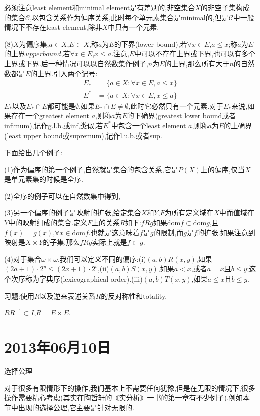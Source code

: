 \documentclass[12pt,a4paper,openany]{book}
\begin{document}
必须注意least element和minimal element是有差别的,非空集合$X$的非空子集构成的集合$\mathscr{C}$,以包含关系作为偏序关系,此时每个单元素集合是minimal的,但是$\mathscr{C}$中一般情况下不存在least element,除非$X$中只有一个元素.

(8)$X$为偏序集,$a \in X$,$E \subset X$,称$a$为$E$的下界(lower bound),若$\forall x \in E$,$a \le x$;称$a$为$E$的上界$upper bound$,若$\forall x \in E$,$x \le a$.注意,$E$中可以不存在上界或下界,也可以有多个上界或下界.后一种情况可以以自然数集作例子,$n$为$E$的上界,那么所有大于$n$的自然数都是$E$的上界.引入两个记号:
\[
\begin{aligned}
E_*&=\{a \in X:\forall x \in E, a \le x\} \\
E^*&=\{a \in X:\forall x \in E, x \le a\}
\end{aligned}
\]
$E_*$以及$E_* \cap E$都可能是$\emptyset$,如果$E_* \cap E \neq \emptyset$,此时它必然只有一个元素.对于$E_*$来说,如果存在一个greatest element $a$,则称$a$为$E$的下确界(greatest lower bound或者infimum),记作g.l.b.或inf,类似,若$E^*$中包含一个least element $a$,则称$a$为$E$的上确界(least upper bound或supremum),记作l.u.b.或者sup.

下面给出几个例子:

(1)作为偏序的第一个例子,自然就是集合的包含关系,它是$P(X)$上的偏序,仅当$X$是单元素集的时候是全序.

(2)全序的例子可以在自然数集中得到,

(3)另一个偏序的例子是映射的扩张,给定集合$X$和$Y$,$F$为所有定义域在$X$中而值域在$Y$中的映射组成的集合.定义$F$上的关系$R$如下:$fRg$如果$\text{dom}{f} \subset \text{dom}{g}$,且$f(x)=g(x)$,$\forall x \in \text{dom}{f}$.也就是这意味着$f$是$g$的限制,而$g$是$f$的扩张.如果注意到映射是$X \times Y$的子集,那么$fRg$实际上就是$f \subset g$.

(4)对于集合$\omega \times \omega$,我们可以定义不同的偏序:(i)$(a,b)R(x,y)$,如果$(2a+1)\cdot 2^y \le (2x+1) \cdot 2^b$,(ii)$(a,b)S(x,y)$,如果$a<x$,或者$a=x$且$b \le y$;这个次序称为字典序(lexicographical order).(iii)$(a,b)T(x,y)$,如果$a \le x$且$b \le y$.

习题:使用$R$以及逆来表述关系$R$的反对称性和totality.

$RR^{-1} \subset I$,$R = E \times E$.

\section{2013年06月10日}
选择公理

对于很多有限情形下的操作,我们基本上不需要任何犹豫,但是在无限的情况下,很多操作需要精心考虑(其实在陶哲轩的《实分析》一书的第一章有不少例子).例如本节中出现的选择公理,它主要是针对无限的.
\end{document}
